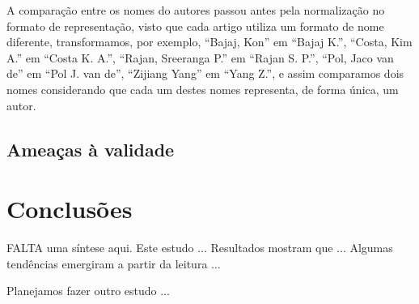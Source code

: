 %

A comparação entre os nomes do autores passou antes pela normalização
no formato de representação, visto que cada artigo utiliza um formato
de nome diferente, transformamos, por exemplo, ``Bajaj, Kon'' em ``Bajaj K.'',
``Costa, Kim A.'' em ``Costa K. A.'', ``Rajan, Sreeranga P.'' em ``Rajan S. P.'',
``Pol, Jaco van de'' em ``Pol J. van de'', ``Zijiang Yang'' em ``Yang Z.'',
e assim comparamos dois nomes considerando que cada um destes nomes representa,
de forma única, um autor.

\subsection{Ameaças à validade}

\section{Conclusões}

FALTA uma síntese aqui. 
Este estudo ...
Resultados mostram que ...
Algumas tendências emergiram a partir da leitura ...

Planejamos fazer outro estudo ... 



%
%
%
%
%
%



